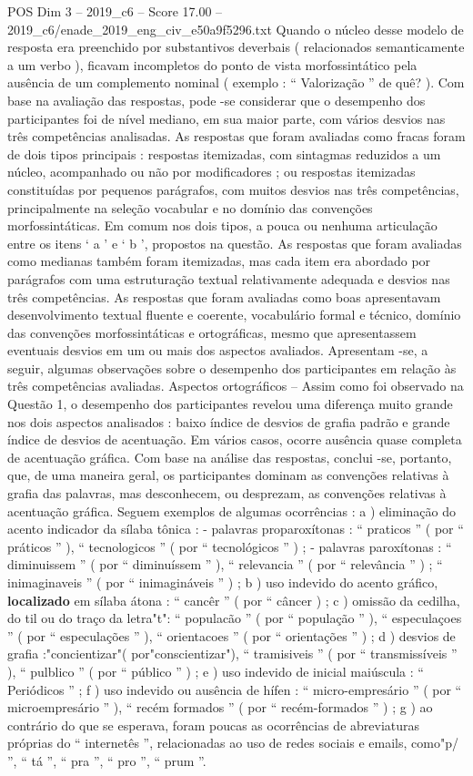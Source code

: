 \begin{textsample}{POS Dim 3 – 2019\_c6 – Score 17.00 – 2019\_c6/enade\_2019\_eng\_civ\_e50a9f5296.txt}
Quando o núcleo desse modelo de resposta era preenchido por substantivos deverbais ( relacionados semanticamente a um verbo ), ficavam incompletos do ponto de vista morfossintático pela ausência de um complemento nominal ( exemplo : “ Valorização ” de quê? ).
Com base na avaliação das respostas, pode -se considerar que o desempenho dos participantes foi de nível mediano, em sua maior parte, com vários desvios nas três competências analisadas.
As respostas que foram avaliadas como fracas foram de dois tipos principais : respostas itemizadas, com sintagmas reduzidos a um núcleo, acompanhado ou não por modificadores ; ou respostas itemizadas constituídas por pequenos parágrafos, com muitos desvios nas três competências, principalmente na seleção vocabular e no domínio das convenções morfossintáticas.
Em comum nos dois tipos, a pouca ou nenhuma articulação entre os itens ‘ a ’ e ‘ b ’, propostos na questão.
As respostas que foram avaliadas como medianas também foram itemizadas, mas cada item era abordado por parágrafos com uma estruturação textual relativamente adequada e desvios nas três competências.
As respostas que foram avaliadas como boas apresentavam desenvolvimento textual fluente e coerente, vocabulário formal e técnico, domínio das convenções morfossintáticas e ortográficas, mesmo que apresentassem eventuais desvios em um ou mais dos aspectos avaliados.
Apresentam -se, a seguir, algumas observações sobre o desempenho dos participantes em relação às três competências avaliadas.
Aspectos ortográficos – Assim como foi observado na Questão 1, o desempenho dos participantes revelou uma diferença muito grande nos dois aspectos analisados : baixo índice de desvios de grafia padrão e grande índice de desvios de acentuação.
Em vários casos, ocorre ausência quase completa de acentuação gráfica.
Com base na análise das respostas, conclui -se, portanto, que, de uma maneira geral, os participantes dominam as convenções relativas à grafia das palavras, mas desconhecem, ou desprezam, as convenções relativas à acentuação gráfica.
Seguem exemplos de algumas ocorrências : a ) eliminação do acento indicador da sílaba tônica : - palavras proparoxítonas : “ praticos ” ( por “ práticos ” ), “ tecnologicos ” ( por “ tecnológicos ” ) ; - palavras paroxítonas : “ diminuissem ” ( por “ diminuíssem ” ), “ relevancia ” ( por “ relevância ” ) ; “ inimaginaveis ” ( por “ inimagináveis ” ) ; b ) uso indevido do acento gráfico, \textbf{localizado} em sílaba átona : “ cancêr ” ( por “ câncer ) ; c ) omissão da cedilha, do til ou do traço da letra"t": “ populacão ” ( por “ população ” ), “ especulaçoes ” ( por “ especulações ” ), “ orientacoes ” ( por “ orientações ” ) ; d ) desvios de grafia :"concientizar"( por"conscientizar"), “ tramisiveis ” ( por “ transmissíveis ” ), “ pulblico ” ( por “ público ” ) ; e ) uso indevido de inicial maiúscula : “ Periódicos ” ; f ) uso indevido ou ausência de hífen : “ micro-empresário ” ( por “ microempresário ” ), “ recém formados ” ( por “ recém-formados ” ) ; g ) ao contrário do que se esperava, foram poucas as ocorrências de abreviaturas próprias do “ internetês ”, relacionadas ao uso de redes sociais e emails, como"p/ ”, “ tá ”, “ pra ”, “ pro ”, “ prum ”.

\end{textsample}
